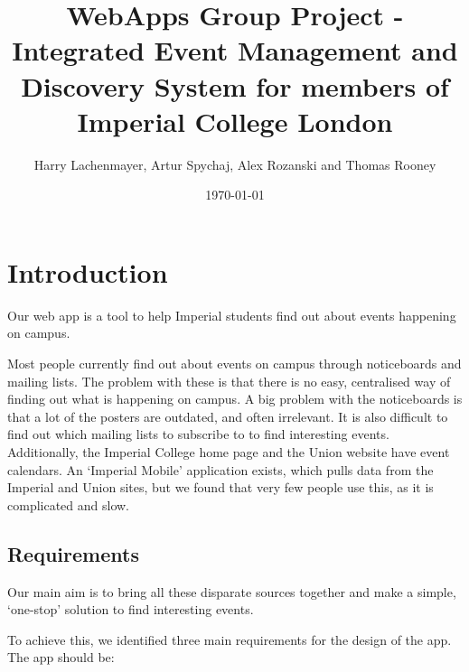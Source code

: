 \documentclass[11pt]{article}
\begin{document}
\title{WebApps Group Project - Integrated Event Management and Discovery System for members of Imperial College London}

\author{Harry Lachenmayer, Artur Spychaj, Alex Rozanski and Thomas Rooney}

\date{\today}         %

\maketitle            %

\section {Introduction}

Our web app is a tool to help Imperial students find out about events happening on campus.

Most people currently find out about events on campus through noticeboards and mailing lists. The problem with these is that there is no easy, centralised way of finding out what is happening on campus. A big problem with the noticeboards is that a lot of the posters are outdated, and often irrelevant. It is also difficult to find out which mailing lists to subscribe to to find interesting events. Additionally, the Imperial College home page and the Union website have event calendars. An `Imperial Mobile' application exists, which pulls data from the Imperial and Union sites, but we found that very few people use this, as it is complicated and slow.

\subsection{Requirements}

Our main aim is to bring all these disparate sources together and make a simple, `one-stop' solution to find interesting events.

To achieve this, we identified three main requirements for the design of the app. The app should be:
\end{document}
